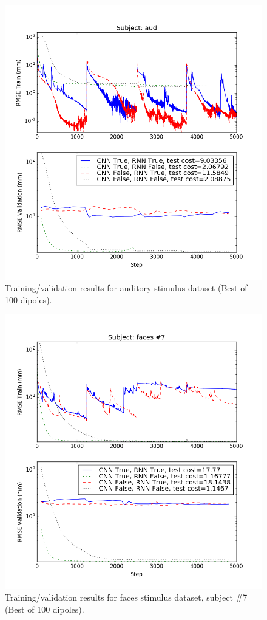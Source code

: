 \documentclass[journal,12pt,onecolumn,draftclsnofoot,]{IEEEtran}
\begin{document}
\begin{figure}[h!]
\centering
\includegraphics[width=7.25in]{aud100}
\caption{Training/validation results for auditory stimulus dataset (Best of 100 dipoles).}
\label{fig:aud100}
\end{figure}

\begin{figure}[h!]
\centering
\includegraphics[width=7.25in]{faces100}
\caption{Training/validation results for faces stimulus dataset, subject \#7 (Best of 100 dipoles).}
\label{fig:faces100}
\end{figure}
\end{document}
